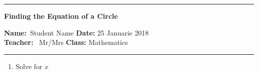 \documentclass[a4paper, 12pt]{article}
\begin{document}
\begin{center}
    \hrule
    \vspace{.4cm}
    {\textbf { \large Finding the Equation of a Circle}}
\end{center}
{\textbf{Name:}\ Student Name \hspace{\fill} \textbf{Date:} 25 Januarie 2018 \\
{ \textbf{Teacher:}} \ Mr/Mrs\hspace{\fill} \textbf{Class:} Mathematics \\
	\hrule }

\begin{enumerate}
\item Solve for $x$

\end{enumerate}
\end{document}

